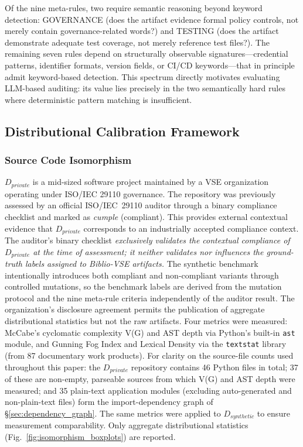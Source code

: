 \documentclass{ieeeaccess}
\begin{document}
Of the nine meta-rules, two require semantic reasoning beyond keyword detection: GOVERNANCE (does the artifact evidence formal policy controls, not merely contain governance-related words?) and TESTING (does the artifact demonstrate adequate test coverage, not merely reference test files?). The remaining seven rules depend on structurally observable signatures---credential patterns, identifier formats, version fields, or CI/CD keywords---that in principle admit keyword-based detection. This spectrum directly motivates evaluating LLM-based auditing: its value lies precisely in the two semantically hard rules where deterministic pattern matching is insufficient.

\subsection{Distributional Calibration Framework}
\label{sec:isomorphism}

\subsubsection{Source Code Isomorphism}

$D_{private}$ is a mid-sized software project maintained by a VSE organization operating under ISO/IEC 29110 governance. The repository was previously assessed by an official ISO/IEC~29110 auditor through a binary compliance checklist and marked as \emph{cumple} (compliant). This provides external contextual evidence that $D_{private}$ corresponds to an industrially accepted compliance context. The auditor's binary checklist \emph{exclusively validates the contextual compliance of $D_{private}$ at the time of assessment; it neither validates nor influences the ground-truth labels assigned to Biblio-VSE artifacts.} The synthetic benchmark intentionally introduces both compliant and non-compliant variants through controlled mutations, so the benchmark labels are derived from the mutation protocol and the nine meta-rule criteria independently of the auditor result. The organization's disclosure agreement permits the publication of aggregate distributional statistics but not the raw artifacts. Four metrics were measured: McCabe's cyclomatic complexity V(G) and AST depth via Python's built-in \texttt{ast} module, and Gunning Fog Index and Lexical Density via the \texttt{textstat} library (from 87 documentary work products). For clarity on the source-file counts used throughout this paper: the $D_{private}$ repository contains 46 Python files in total; 37 of these are non-empty, parseable sources from which V(G) and AST depth were measured; and 35 plain-text application modules (excluding auto-generated and non-plain-text files) form the import-dependency graph of §\ref{sec:dependency_graph}. The same metrics were applied to $D_{synthetic}$ to ensure measurement comparability. Only aggregate distributional statistics (Fig.~\ref{fig:isomorphism_boxplots}) are reported.
\end{document}
